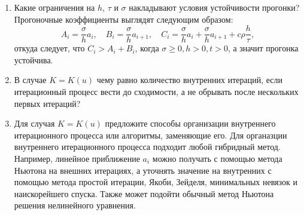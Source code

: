 \documentclass[12pt, a4paper]{article}
\begin{document}
\begin{enumerate}
\item Какие ограничения на $h$, $\tau$ и $\sigma$ накладывают условия устойчивости прогонки?
Прогоночные коэффициенты выглядят следующим образом:
\[
    A_i = \dfrac{\sigma}{h}a_i, \quad B_i = \dfrac{\sigma}{h}a_{i+1}, \quad C_i = \dfrac{\sigma}{h}a_i + \dfrac{\sigma}{h}a_{i+1} + c \rho \dfrac{h}{\tau},
\]
\noindent откуда следует, что $ C_i > A_i + B_i $, когда $ \sigma \geq 0, h > 0, t > 0 $, а значит прогонка устойчива.

\item В случае $K=K(u)$ чему равно количество внутренних итераций, если итерационный процесс вести до сходимости, а не обрывать после нескольких первых итераций?

\item Для случая $K = K(u)$ предложите способы организации внутреннего итерационного процесса или алгоритмы, заменяющие его.
Для органазции внутреннего итерационного процесса подходит любой гибридный метод. Например, линейное приближение $a_i$ можно получать с помощью метода Ньютона на внешних итерациях, а уточнять значение на внутренних с помощью метода простой итерации, Якоби, Зейделя, минимальных невязок и наискорейшего спуска. Также может подойти обычный метод Ньютона решения нелинейного уравнения.  

\end{enumerate}


\newpage
\end{document}
